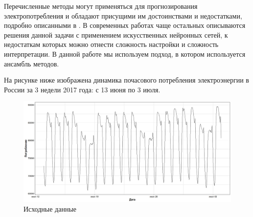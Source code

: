 \documentclass[60x84/16,8pt]{ittmm}
\begin{document}
Перечисленные методы могут применяться для прогнозирования электропотребления и
обладают присущими им достоинствами и недостатками, подробно описанными в
\cite{Tihonov2006}. В современных работах чаще остальных описываются решения
данной задачи с применением искусственных нейронных сетей, к недостаткам которых
можно отнести сложность настройки и сложность интерпретации. В данной работе мы
используем подход, в котором используется ансамбль методов.

На рисунке ниже изображена динамика почасового потребления электроэнергии в
России за 3 недели 2017 года: с 13 июня по 3 июля.
\begin{figure}
  \centering
  \includegraphics[width=0.8\linewidth]{Ru/train_dataset.jpeg}
  \caption{Исходные данные}
  \label{fig:data}
\end{figure}
\end{document}
